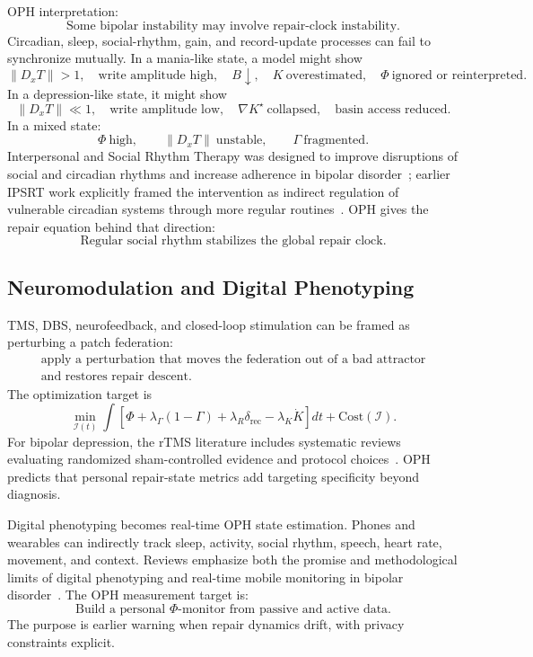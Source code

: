 \documentclass[11pt]{article}
\theoremstyle{remark}
\theoremstyle{plain}
\newcommand{\rec}{\mathrm{rec}}
\begin{document}
OPH interpretation:
\[
\boxed{
\text{Some bipolar instability may involve repair-clock instability.}
}
\]
Circadian, sleep, social-rhythm, gain, and record-update processes can fail to synchronize mutually.
In a mania-like state, a model might show
\[
\|D_xT\|>1,\quad
\text{write amplitude high},\quad
B\downarrow,\quad
K\ \text{overestimated},\quad
\Phi\ \text{ignored or reinterpreted}.
\]
In a depression-like state, it might show
\[
\|D_xT\|\ll1,\quad
\text{write amplitude low},\quad
\nabla K^\star\ \text{collapsed},\quad
\text{basin access reduced}.
\]
In a mixed state:
\[
\Phi\ \text{high},\qquad
\|D_xT\|\ \text{unstable},\qquad
\Gamma\ \text{fragmented}.
\]
Interpersonal and Social Rhythm Therapy was designed to improve disruptions of social and circadian rhythms and increase adherence in bipolar disorder~\cite{Steardo2020IPSRT}; earlier IPSRT work explicitly framed the intervention as indirect regulation of vulnerable circadian systems through more regular routines~\cite{FrankIPSRT2011}. OPH gives the repair equation behind that direction:
\[
\boxed{
\text{Regular social rhythm stabilizes the global repair clock.}
}
\]

\subsection{Neuromodulation and Digital Phenotyping}

TMS, DBS, neurofeedback, and closed-loop stimulation can be framed as perturbing a patch federation:
\[
\boxed{
\begin{gathered}
\text{apply a perturbation that moves the federation out of a bad attractor}\\
\text{and restores repair descent.}
\end{gathered}
}
\]
The optimization target is
\[
\boxed{
\min_{\mathcal I(t)}
\int
\left[
\Phi
+
\lambda_\Gamma(1-\Gamma)
+
\lambda_R\delta_{\rec}
-
\lambda_K\dot K
\right]dt
+
\mathrm{Cost}(\mathcal I).
}
\]
For bipolar depression, the rTMS literature includes systematic reviews evaluating randomized sham-controlled evidence and protocol choices~\cite{Tseng2024RTMS,Ventura2026TMS}. OPH predicts that personal repair-state metrics add targeting specificity beyond diagnosis.

Digital phenotyping becomes real-time OPH state estimation. Phones and wearables can indirectly track sleep, activity, social rhythm, speech, heart rate, movement, and context. Reviews emphasize both the promise and methodological limits of digital phenotyping and real-time mobile monitoring in bipolar disorder~\cite{Orsolini2020DigitalPhenotyping,Dunster2021MobileMonitoring}. The OPH measurement target is:
\[
\boxed{
\text{Build a personal }\Phi\text{-monitor from passive and active data.}
}
\]
The purpose is earlier warning when repair dynamics drift, with privacy constraints explicit.
\end{document}
